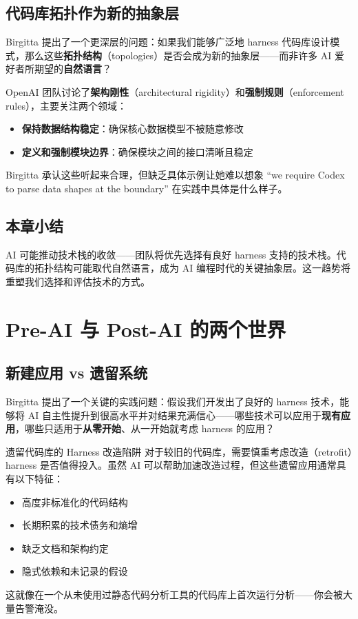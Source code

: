 \documentclass[a4paper]{article}
\begin{document}
\subsection{代码库拓扑作为新的抽象层}

Birgitta 提出了一个更深层的问题：如果我们能够广泛地 harness 代码库设计模式，那么这些\textbf{拓扑结构}（topologies）是否会成为新的抽象层------而非许多 AI 爱好者所期望的\textbf{自然语言}？

OpenAI 团队讨论了\textbf{架构刚性}（architectural rigidity）和\textbf{强制规则}（enforcement rules），主要关注两个领域：

\begin{itemize}[leftmargin=1.5em]
    \item \textbf{保持数据结构稳定}：确保核心数据模型不被随意修改
    \item \textbf{定义和强制模块边界}：确保模块之间的接口清晰且稳定
\end{itemize}

Birgitta 承认这些听起来合理，但缺乏具体示例让她难以想象 ``we require Codex to parse data shapes at the boundary'' 在实践中具体是什么样子。

\subsection{本章小结}

AI 可能推动技术栈的收敛------团队将优先选择有良好 harness 支持的技术栈。代码库的拓扑结构可能取代自然语言，成为 AI 编程时代的关键抽象层。这一趋势将重塑我们选择和评估技术的方式。

\newpage

\section{Pre-AI 与 Post-AI 的两个世界}

\subsection{新建应用 vs 遗留系统}

Birgitta 提出了一个关键的实践问题：假设我们开发出了良好的 harness 技术，能够将 AI 自主性提升到很高水平并对结果充满信心------哪些技术可以应用于\textbf{现有应用}，哪些只适用于\textbf{从零开始}、从一开始就考虑 harness 的应用？

\begin{warningbox}{遗留代码库的 Harness 改造陷阱}
对于较旧的代码库，需要慎重考虑改造（retrofit）harness 是否值得投入。虽然 AI 可以帮助加速改造过程，但这些遗留应用通常具有以下特征：
\begin{itemize}[leftmargin=1.5em]
    \item 高度非标准化的代码结构
    \item 长期积累的技术债务和熵增
    \item 缺乏文档和架构约定
    \item 隐式依赖和未记录的假设
\end{itemize}
这就像在一个从未使用过静态代码分析工具的代码库上首次运行分析------你会被大量告警淹没。
\end{warningbox}
\end{document}
